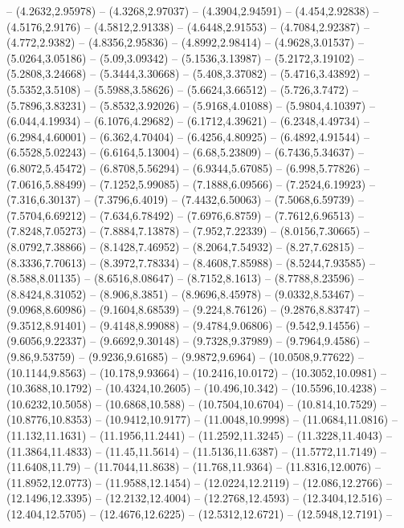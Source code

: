 {  -- (4.2632,2.95978) -- (4.3268,2.97037) -- (4.3904,2.94591) -- (4.454,2.92838) -- (4.5176,2.9176) -- (4.5812,2.91338) -- (4.6448,2.91553) -- (4.7084,2.92387) -- (4.772,2.9382) -- (4.8356,2.95836) -- (4.8992,2.98414) -- (4.9628,3.01537) --
  (5.0264,3.05186) -- (5.09,3.09342) -- (5.1536,3.13987) -- (5.2172,3.19102) -- (5.2808,3.24668) -- (5.3444,3.30668) -- (5.408,3.37082) -- (5.4716,3.43892) -- (5.5352,3.5108) -- (5.5988,3.58626) -- (5.6624,3.66512) -- (5.726,3.7472) --
  (5.7896,3.83231) -- (5.8532,3.92026) -- (5.9168,4.01088) -- (5.9804,4.10397) -- (6.044,4.19934) -- (6.1076,4.29682) -- (6.1712,4.39621) -- (6.2348,4.49734) -- (6.2984,4.60001) -- (6.362,4.70404) -- (6.4256,4.80925) -- (6.4892,4.91544) --
  (6.5528,5.02243) -- (6.6164,5.13004) -- (6.68,5.23809) -- (6.7436,5.34637) -- (6.8072,5.45472) -- (6.8708,5.56294) -- (6.9344,5.67085) -- (6.998,5.77826) -- (7.0616,5.88499) -- (7.1252,5.99085) -- (7.1888,6.09566) -- (7.2524,6.19923) --
  (7.316,6.30137) -- (7.3796,6.4019) -- (7.4432,6.50063) -- (7.5068,6.59739) -- (7.5704,6.69212) -- (7.634,6.78492) -- (7.6976,6.8759) -- (7.7612,6.96513) -- (7.8248,7.05273) -- (7.8884,7.13878) -- (7.952,7.22339) -- (8.0156,7.30665) --
  (8.0792,7.38866) -- (8.1428,7.46952) -- (8.2064,7.54932) -- (8.27,7.62815) -- (8.3336,7.70613) -- (8.3972,7.78334) -- (8.4608,7.85988) -- (8.5244,7.93585) -- (8.588,8.01135) -- (8.6516,8.08647) -- (8.7152,8.1613) -- (8.7788,8.23596) --
  (8.8424,8.31052) -- (8.906,8.3851) -- (8.9696,8.45978) -- (9.0332,8.53467) -- (9.0968,8.60986) -- (9.1604,8.68539) -- (9.224,8.76126) -- (9.2876,8.83747) -- (9.3512,8.91401) -- (9.4148,8.99088) -- (9.4784,9.06806) -- (9.542,9.14556) --
  (9.6056,9.22337) -- (9.6692,9.30148) -- (9.7328,9.37989) -- (9.7964,9.4586) -- (9.86,9.53759) -- (9.9236,9.61685) -- (9.9872,9.6964) -- (10.0508,9.77622) -- (10.1144,9.8563) -- (10.178,9.93664) -- (10.2416,10.0172) -- (10.3052,10.0981) --
  (10.3688,10.1792) -- (10.4324,10.2605) -- (10.496,10.342) -- (10.5596,10.4238) -- (10.6232,10.5058) -- (10.6868,10.588) -- (10.7504,10.6704) -- (10.814,10.7529) -- (10.8776,10.8353) -- (10.9412,10.9177) -- (11.0048,10.9998) -- (11.0684,11.0816) --
  (11.132,11.1631) -- (11.1956,11.2441) -- (11.2592,11.3245) -- (11.3228,11.4043) -- (11.3864,11.4833) -- (11.45,11.5614) -- (11.5136,11.6387) -- (11.5772,11.7149) -- (11.6408,11.79) -- (11.7044,11.8638) -- (11.768,11.9364) -- (11.8316,12.0076) --
  (11.8952,12.0773) -- (11.9588,12.1454) -- (12.0224,12.2119) -- (12.086,12.2766) -- (12.1496,12.3395) -- (12.2132,12.4004) -- (12.2768,12.4593) -- (12.3404,12.516) -- (12.404,12.5705) -- (12.4676,12.6225) -- (12.5312,12.6721) -- (12.5948,12.7191) --
}
